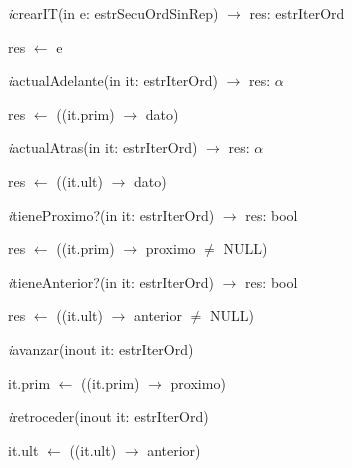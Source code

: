 \textit{i}crearIT(in e: estrSecuOrdSinRep) $\longrightarrow$ res: estrIterOrd\\
\begin{algorithm}[H]
\BlankLine
res $\leftarrow$ e
\end{algorithm}

\textit{i}actualAdelante(in it: estrIterOrd) $\longrightarrow$ res: $\alpha$\\
\begin{algorithm}[H]
\BlankLine
res $\leftarrow$ ((it.prim) $\rightarrow$ dato)
\end{algorithm}

\textit{i}actualAtras(in it: estrIterOrd) $\longrightarrow$ res: $\alpha$\\
\begin{algorithm}[H]
\BlankLine
res $\leftarrow$ ((it.ult) $\rightarrow$ dato)
\end{algorithm}

\textit{i}tieneProximo?(in it: estrIterOrd) $\longrightarrow$ res: bool\\
\begin{algorithm}[H]
\BlankLine
res $\leftarrow$ ((it.prim) $\rightarrow$ proximo $\neq$ NULL)
\end{algorithm}

\textit{i}tieneAnterior?(in it: estrIterOrd) $\longrightarrow$ res: bool\\
\begin{algorithm}[H]
\BlankLine
res $\leftarrow$ ((it.ult) $\rightarrow$ anterior $\neq$ NULL)
\end{algorithm}

\textit{i}avanzar(inout it: estrIterOrd)\\
\begin{algorithm}[H]
\BlankLine
it.prim $\leftarrow$ ((it.prim) $\rightarrow$ proximo)
\end{algorithm}

\newpage
\textit{i}retroceder(inout it: estrIterOrd)\\
\begin{algorithm}[H]
\BlankLine
it.ult $\leftarrow$ ((it.ult) $\rightarrow$ anterior)
\end{algorithm}
